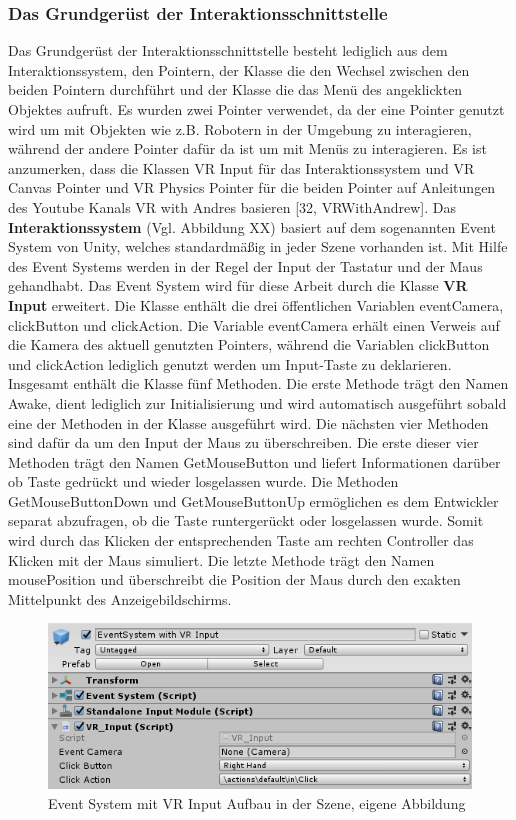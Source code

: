 \subsubsection{Das Grundgerüst der Interaktionsschnittstelle}\label{sec:GrundgerüstInteraktion}
Das Grundgerüst der Interaktionsschnittstelle besteht lediglich aus dem Interaktionssystem, den Pointern, der Klasse die den Wechsel zwischen den beiden Pointern durchführt und der Klasse die das Menü des angeklickten Objektes aufruft. Es wurden zwei Pointer verwendet, da der eine Pointer genutzt wird um mit Objekten wie z.B. Robotern in der Umgebung zu interagieren, während der andere Pointer dafür da ist um mit Menüs zu interagieren. Es ist anzumerken, dass die Klassen VR Input für das Interaktionssystem und VR Canvas Pointer und VR Physics Pointer für die beiden Pointer auf Anleitungen des Youtube Kanals VR with Andres basieren [32, VRWithAndrew].
\newline\newline
Das \textbf{Interaktionssystem} (Vgl. Abbildung XX) basiert auf dem sogenannten Event System von Unity, welches standardmäßig in jeder Szene vorhanden ist. Mit Hilfe des Event Systems werden in der Regel der Input der Tastatur und der Maus gehandhabt. Das Event System wird für diese Arbeit durch die Klasse \textbf{VR Input} erweitert. Die Klasse enthält die drei öffentlichen Variablen eventCamera, clickButton und clickAction. Die Variable eventCamera erhält einen Verweis auf die Kamera des aktuell genutzten Pointers, während die Variablen clickButton und clickAction lediglich genutzt werden um Input-Taste zu deklarieren.
\newline
Insgesamt enthält die Klasse fünf Methoden. Die erste Methode trägt den Namen Awake, dient lediglich zur Initialisierung und wird automatisch ausgeführt sobald eine der Methoden in der Klasse ausgeführt wird. Die nächsten vier Methoden sind dafür da um den Input der Maus zu überschreiben. Die erste dieser vier Methoden trägt den Namen GetMouseButton und liefert Informationen darüber ob Taste gedrückt und wieder losgelassen wurde. Die Methoden GetMouseButtonDown und GetMouseButtonUp ermöglichen es dem Entwickler separat abzufragen, ob die Taste runtergerückt oder losgelassen wurde. Somit wird durch das Klicken der entsprechenden Taste am rechten Controller das Klicken mit der Maus simuliert. Die letzte Methode trägt den Namen mousePosition und überschreibt die Position der Maus durch den exakten Mittelpunkt des Anzeigebildschirms.
\begin{figure}[h]
	\centering
	\includegraphics[width=0.5\linewidth]{Bilder/A41_EventSystem}
	\caption{Event System mit VR Input Aufbau in der Szene, eigene Abbildung}
	\label{fig:EventSystem}
\end{figure}
